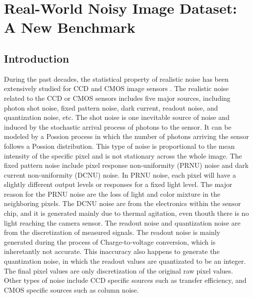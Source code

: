 %
\chapter{Real-World Noisy Image Dataset: A New Benchmark}
\label{sec:dataset}

\section{Introduction}

During the past decades, the statistical property of realistic noise has been extensively studied for CCD and CMOS image sensors \cite{healey1994radiometric,tsin2001statistical,RENOIR2014,crosschannel2016,dnd2017}. The realistic noise related to the CCD or CMOS sensors includes five major sources, including photon shot noise, fixed pattern noise, dark current, readout noise, and quantization noise, etc. The shot noise is one inevitable source of noise and induced by the stochastic arrival process of photons to the sensor. It can be modeled by a Possion process in which the number of photons arriving the sensor follows a Possion distribution. This type of noise is proportional to the mean intensity of the specific pixel and is not stationary across the whole image. The fixed pattern noise include pixel response non-uniformity (PRNU) noise and dark current non-uniformity (DCNU) noise. In PRNU noise, each pixel will have a slightly different output levels or responses for a fixed light level. The major reason for the PRNU noise are the loss of light and color mixture in the neighboring pixels. The DCNU noise are from the electronics within the sensor chip, and it is generated mainly due to thermal agitation, even thouth there is no light reaching the camera sensor. The readout noise and quantization noise are from the discretization of measured signals. The readout noise is mainly generated during the process of Charge-to-voltage conversion, which is inheretantly not accurate. This inaccuracy also happens to generate the quantization noise, in which the readout values are quantizated to be an integer. The final pixel values are only discretization of the original raw pixel values. Other types of noise include CCD specific sources such as transfer efficiency, and CMOS specific sources such as column noise.

